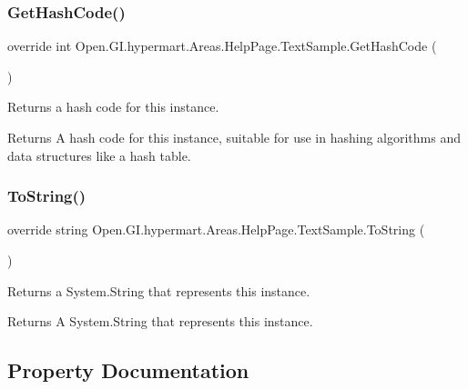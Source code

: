 \subsubsection{\texorpdfstring{Get\+Hash\+Code()}{GetHashCode()}}
{\footnotesize\ttfamily override int Open.\+G\+I.\+hypermart.\+Areas.\+Help\+Page.\+Text\+Sample.\+Get\+Hash\+Code (\begin{DoxyParamCaption}{ }\end{DoxyParamCaption})}



Returns a hash code for this instance. 

\begin{DoxyReturn}{Returns}
A hash code for this instance, suitable for use in hashing algorithms and data structures like a hash table. 
\end{DoxyReturn}
\hypertarget{class_open_1_1_g_i_1_1hypermart_1_1_areas_1_1_help_page_1_1_text_sample_a06ee6af965d7778dcb62e1d49af71740}{}\label{class_open_1_1_g_i_1_1hypermart_1_1_areas_1_1_help_page_1_1_text_sample_a06ee6af965d7778dcb62e1d49af71740} 
\subsubsection{\texorpdfstring{To\+String()}{ToString()}}
{\footnotesize\ttfamily override string Open.\+G\+I.\+hypermart.\+Areas.\+Help\+Page.\+Text\+Sample.\+To\+String (\begin{DoxyParamCaption}{ }\end{DoxyParamCaption})}



Returns a System.\+String that represents this instance. 

\begin{DoxyReturn}{Returns}
A System.\+String that represents this instance. 
\end{DoxyReturn}


\subsection{Property Documentation}
\hypertarget{class_open_1_1_g_i_1_1hypermart_1_1_areas_1_1_help_page_1_1_text_sample_aac44397744d5ca5d933bc1d85b07eda6}{}\label{class_open_1_1_g_i_1_1hypermart_1_1_areas_1_1_help_page_1_1_text_sample_aac44397744d5ca5d933bc1d85b07eda6} 
